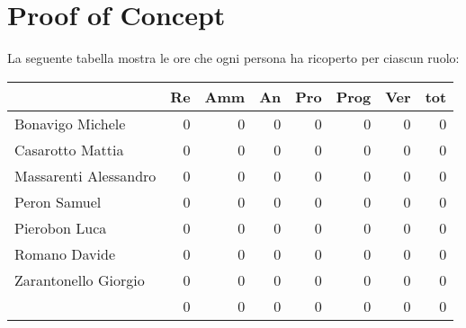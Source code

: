 \section{Proof of Concept}

La seguente tabella mostra le ore che ogni persona ha ricoperto per ciascun ruolo:

\begin{table}[ht]
    \begin{tabularx}{\linewidth}{X|rrrrrrr}
    \rowcolor{gray!30}& Re & Amm & An & Pro & Prog & Ver & tot \\
    \hline
    Bonavigo Michele                        & 0 & 0 & 0 & 0 & 0 & 0 & 0 \\
    \rowcolor{gray!10}Casarotto Mattia      & 0 & 0 & 0 & 0 & 0 & 0 & 0 \\
    Massarenti Alessandro                   & 0 & 0 & 0 & 0 & 0 & 0 & 0 \\
    \rowcolor{gray!10}Peron Samuel          & 0 & 0 & 0 & 0 & 0 & 0 & 0 \\
    Pierobon Luca                           & 0 & 0 & 0 & 0 & 0 & 0 & 0 \\
    \rowcolor{gray!10}Romano Davide         & 0 & 0 & 0 & 0 & 0 & 0 & 0 \\
    Zarantonello Giorgio                    & 0 & 0 & 0 & 0 & 0 & 0 & 0 \\
    \hline                                  & 0 & 0 & 0 & 0 & 0 & 0 & 0 \\ 
    \end{tabularx}
\end{table}